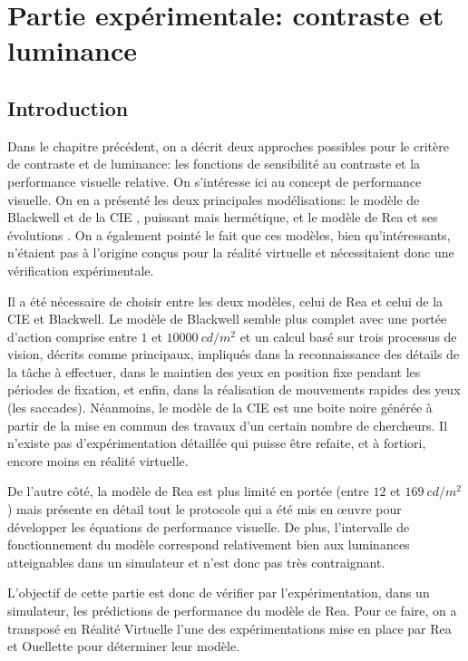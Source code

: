 \part{Partie expérimentale: contraste et luminance}

\chapter*{Introduction}
\par Dans le chapitre précédent, on a décrit deux approches possibles pour le critère de contraste et de luminance: les fonctions de sensibilité au contraste et la performance visuelle relative. On s'intéresse ici au concept de performance visuelle. On en a présenté les deux principales modélisations: le modèle de Blackwell et de la CIE \citep{blackwell_ieri:_1971}, puissant mais hermétique, et le modèle de Rea et ses évolutions \citep{rea_toward_1986}. On a également pointé le fait que ces modèles, bien qu'intéressants, n'étaient pas à l'origine conçus pour la réalité virtuelle et nécessitaient donc une vérification expérimentale.

\par Il a été nécessaire de choisir entre les deux modèles, celui de Rea et celui de la CIE et Blackwell. Le modèle de Blackwell semble plus complet avec une portée d'action comprise entre $1$ et $10000~cd/m^2$ et un calcul basé sur trois processus de vision, décrits comme principaux, impliqués dans la reconnaissance des détails de la tâche à effectuer, dans le maintien des yeux en position fixe pendant les périodes de fixation, et enfin, dans la réalisation de mouvements rapides des yeux (les saccades). Néanmoins, le modèle de la CIE est une boite noire générée à partir de la mise en commun des travaux d'un certain nombre de chercheurs. Il n'existe pas d'expérimentation détaillée qui puisse être refaite, et à fortiori, encore moins en réalité virtuelle.

\par De l'autre côté, la modèle de Rea est plus limité en portée (entre $12$ et $169~cd/m^2$) mais présente en détail tout le protocole qui a été mis en œuvre pour développer les équations de performance visuelle. De plus, l'intervalle de fonctionnement du modèle correspond relativement bien aux luminances atteignables dans un simulateur et n'est donc pas très contraignant.

\par L'objectif de cette partie est donc de vérifier par l'expérimentation, dans un simulateur, les prédictions de performance du modèle de Rea. Pour ce faire, on a transposé en Réalité Virtuelle l'une des expérimentations mise en place par Rea et Ouellette pour déterminer leur modèle.